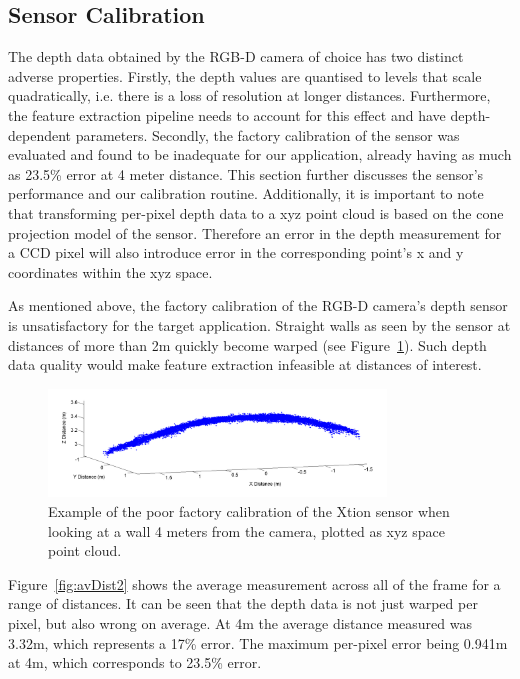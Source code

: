 \documentclass[]{article}
\begin{document}
{\subsection{Sensor Calibration} %

The depth data obtained by the RGB-D camera of choice has two distinct adverse properties. Firstly, the depth values are quantised to levels that scale quadratically, i.e. there is a loss of resolution at longer distances. Furthermore, the feature extraction pipeline needs to account for this effect and have depth-dependent parameters. Secondly, the factory calibration of the sensor was evaluated and found to be inadequate for our application, already having as much as 23.5\% error at 4 meter distance. This section further discusses the sensor's performance and our calibration routine.
Additionally, it is important to note that transforming per-pixel depth data to a xyz point cloud is based on the cone projection model of the sensor. Therefore an error in the depth measurement for a CCD pixel will also introduce error in the corresponding point's x and y coordinates within the xyz space.

As mentioned above, the factory calibration of the RGB-D camera's depth sensor is unsatisfactory for the target application. Straight walls as seen by the sensor at distances of more than 2m quickly become warped (see Figure~\ref{fig:uncal5m2}). Such depth data quality would make feature extraction infeasible at distances of interest.


\begin{figure}[H]
\centering     %
\includegraphics[width=0.8\textwidth]{uncal5m2.PNG}
\caption{Example of the poor factory calibration of the Xtion sensor when looking at a wall 4 meters from the camera, plotted as xyz space point cloud.}
\label{fig:uncal5m2}
\end{figure}

Figure~\ref{fig:avDist2} shows the average measurement across all of the frame for a range of distances. It can be seen that the depth data is not just warped per pixel, but also wrong on average. At 4m the average distance measured was 3.32m, which represents a 17\% error. The maximum per-pixel error being 0.941m at 4m, which corresponds to 23.5\% error. 

}
\end{document}
